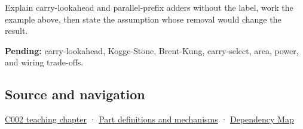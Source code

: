 Explain carry-lookahead and parallel-prefix adders without the label, work the example above, then state the assumption whose removal would change the result.

\textbf{Pending:} carry-lookahead, Kogge-Stone, Brent-Kung, carry-select, area, power, and wiring trade-offs.

\subsection{Source and navigation}\label{appendix-b5c46b2d94ff-source-and-navigation}

\hyperref[01-foundations-i-ch001-arithmetic-becomes-a-policy]{C002 teaching chapter} · \hyperref[appendix-fd090d982a15]{Part definitions and mechanisms} · \hyperref[appendix-4ad47bdd269a]{Dependency Map}
